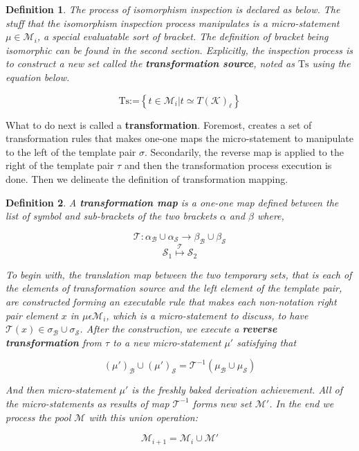 \documentclass{article}
\newtheorem{definition}{Definition}
\begin{document}
\begin{definition}
	The process of isomorphism inspection is declared as below. The stuff that the isomorphism inspection process manipulates is a micro-statement \(\mu \in \mathcal{M}_i\), a special evaluatable sort of bracket. The definition of bracket being isomorphic can be found in the second section. Explicitly, the inspection process is to construct a new set called the \textbf{ transformation source}, noted as \(\text{Ts}\) using the equation below.
	
	\[\text{Ts}\text{:=}\left\{t\in \mathcal{M}_i|t\simeq T(\mathcal{K})_{\ell }\right\}\]
\end{definition}

What to do next is called a \textbf{ transformation}. Foremost, creates a set of transformation rules that makes one-one maps the micro-statement to manipulate to the left of the template pair \(\sigma\). Secondarily, the reverse map is applied to the right of the template pair \(\tau\) and then the transformation process execution is done. Then we delineate the definition of { }transformation mapping.

\begin{definition}
	A \textbf{ transformation map} is a one-one map defined between the list of symbol and sub-brackets of the two brackets \(\alpha\) and \(\beta\) where,
	
	\[\mathcal{T}:\alpha _{\mathcal{B}}\cup \alpha _{\mathcal{S}}\to \beta _{\mathcal{B}}\cup \beta _{\mathcal{S}}\]
	\[\mathcal{S}_1\overset{\mathcal{T}}{\mapsto }\mathcal{S}_2\]
	
	To begin with, the translation map between the two temporary sets, that is each of the elements of transformation source and the left element of the template pair, are constructed forming an executable rule that makes each non-notation right pair element \(x\) in \(\mu \epsilon \mathcal{M}_i\), which is a micro-statement to discuss, to have \(\mathcal{T}(x)\in \sigma _{\mathcal{B}}\cup \sigma _{\mathcal{S}}\). After the construction, we execute a \textbf{ reverse transformation } from \(\tau\) to a new micro-statement \(\mu '\) satisfying that
	
	\[(\mu ')_{\mathcal{B}}\cup (\mu ')_{\mathcal{S}} =\mathcal{T}^{-1}\left(\mu _{\mathcal{B}}\cup \mu _{\mathcal{S}}\right)\]
	
	And then micro-statement \(\mu '\) is the freshly baked derivation achievement. All of the micro-statements as results of map \(\mathcal{T}^{-1}\) forms new set \(\mathcal{M}'\). In the end we process the pool \(\mathcal{M}\) with this union operation:
	
	\[\mathcal{M}_{i+1}=\mathcal{M}_i\cup \mathcal{M}'\]
\end{definition}
\end{document}
